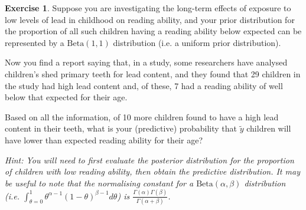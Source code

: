 \documentclass{article}
\theoremstyle{plain}
\theoremstyle{definition}
\newtheorem{exercise}{Exercise}
\begin{document}
\newpage
\begin{exercise}
Suppose you are investigating the long-term effects of exposure to low
levels of lead in childhood on reading ability, and your prior distribution
for the proportion of all such children having a reading ability below
expected can be represented by a $\mathrm{Beta}(1, 1)$ distribution (i.e. a uniform
prior distribution).

Now you find a report saying that, in a study, some researchers have
analysed children’s shed primary teeth for lead content, and they found
that 29 children in the study had high lead content and, of these, 7 had
a reading ability of well below that expected for their age.

Based on all the information, of 10 more children found to have a high
lead content in their teeth, what is your (predictive) probability that $\tilde{y}$ children will have lower than expected reading ability for their age?

\emph{Hint: You will need to first evaluate the posterior distribution for the
proportion of children with low reading ability, then obtain the predictive
distribution. It may be useful to note that the normalising constant for
a $\mathrm{Beta}(\alpha, \beta)$ distribution (i.e. $\int^1_{\theta=0} \theta^{\alpha - 1}(1 - \theta)^{\beta - 1}d\theta$) is $\frac{\Gamma(\alpha)\Gamma(\beta)}{\Gamma(\alpha+\beta)}$.}
\end{exercise}
\end{document}

